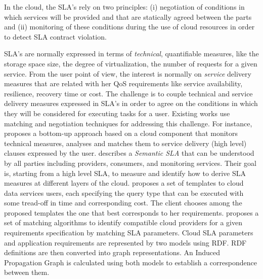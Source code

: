 In the cloud, the   SLA's rely on two principles: (i)  negotiation of conditions in which services will be provided and that are statically agreed between the parts and (ii)  monitoring of these conditions during the use of cloud resources in order to detect SLA contract violation.




SLA's are normally expressed in terms of \textit{technical}, quantifiable measures, like the storage space size, the degree of virtualization, the number of requests for a given service. 
From the user point of view, the interest is normally on \textit{service} delivery measures that are related with her QoS requirements like service availability, resilience, recovery time or cost.
The challenge is to couple technical and service delivery measures expressed in SLA's in order to agree on the conditions in which they will be considered for executing tasks for a user. Existing works use matching and negotiation techniques for addressing this challenge.  
For instance,~\cite{5547150} 
proposes a bottom-up approach based on a cloud component that monitors technical measures, analyses and matches them to service delivery (high level) clauses expressed by the user.
  \cite{Dastjerdi:2012:DOA:2275356.2275360} describes a \textit{Semantic SLA} that can be understood by all parties including providers, consumers, and monitoring services.
Their goal is, starting from a high level SLA, to measure and identify how to derive SLA measures  at different layers of the cloud.  \cite{Ortiz:2013:VPS:2486767.2486772}
  proposes a set of templates to  cloud data services users, each specifying the query type that can be executed with some tread-off in time and corresponding cost.  The client  chooses among the proposed templates the one that best corresponds   to her requirements. \cite{6141307} proposes a set of matching algorithms to identify compatible cloud providers for a given requirements specification by matching SLA parameters. Cloud SLA parameters and application requirements are represented by two models using RDF. RDF definitions are then converted into graph representations. An Induced Propagation Graph is calculated using both models to establish a correspondence between them.


